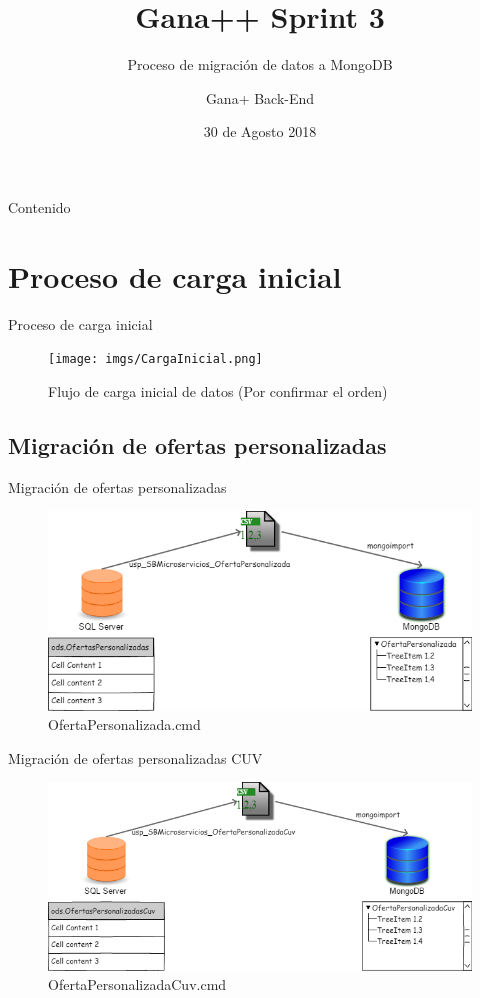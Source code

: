 \documentclass{bredelebeamer}
\title[Gana++ Sprint 3]{Gana++ Sprint 3}
\subtitle{Proceso de migración de datos a MongoDB}
\author{Gana+ Back-End}%
\institute[Hundred]
{
César Cárdenas
  }
\date{30 de Agosto 2018}
\begin{document}
\begin{frame}
  \titlepage
\end{frame}

\begin{frame}{Contenido}
  \tableofcontents
\end{frame}

\section{Proceso de carga inicial}
\begin{frame}{Proceso de carga inicial}
\begin{figure}
\centering
\texttt{[image: imgs/CargaInicial.png]}
\caption{Flujo de carga inicial de datos (Por confirmar el orden)}
\end{figure}
\end{frame}

\subsection{Migración de ofertas personalizadas}
\begin{frame}{Migración de ofertas personalizadas}
\begin{figure}
\centering
\includegraphics[scale=0.35]{imgs/OfertaPersonalizada.png}
\caption{OfertaPersonalizada.cmd}
\end{figure}
\end{frame}

\begin{frame}{Migración de ofertas personalizadas CUV}
\begin{figure}
\centering
\includegraphics[scale=0.35]{imgs/OfertaPersonalizadaCuv.png}
\caption{OfertaPersonalizadaCuv.cmd}
\end{figure}
\end{frame}
\end{document}
